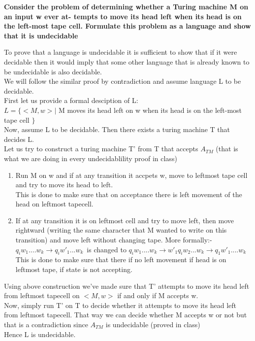 \documentclass{article}
\begin{document}
\textbf{Consider the problem of determining whether a Turing machine M on an input w ever at-
tempts to move its head left when its head is on the left-most tape cell. Formulate this
problem as a language and show that it is undecidable\\}

To prove that a language is undecidable it is sufficient to show that if it were decidable then it would imply
that some other language that is already known to be undecidable is also decidable.\\
We will follow the similar proof by contradiction and assume language L to be decidable.\\
First let us provide a formal desciption of L:\\
$L = \{ <M,w> | $ M moves its head left on w when its head is on the left-most tape cell $ \}$\\

Now, assume L to be decidable. Then there exists a turing machine T that decides L.\\
Let us try to construct a turing machine T' from T that accepts $A_{TM}$ (that is what we are doing in every undecidablility proof in class)
\begin{enumerate}
    \item Run M on w and if at any transition it accpets w, move to leftmost tape cell and try to move its head to left.\\
        This is done to make sure that on acceptance there is left movement of the head on leftmost tapecell.\\
    \item If at any transition it is on leftmost cell and try to move left, then move rightward (writing the same character that M wanted to write on this transition) and move 
            left without changing tape. More formally:- \\
            $q_iw_1....w_k \rightarrow q_iw'_1...w_k $\ is changed to $q_iw_1....w_k \rightarrow w'_1q_iw_2...w_k \rightarrow q_1w'_1....w_k$\\
            This is done to make sure that there if no left movement if head is on leftmost tape, if state is not accepting.
\end{enumerate} 

Using above construction we've made sure that T' attempts to move its head left from leftmost tapecell on $<M,w>$ if and only if M accepts w.\\
Now, simply run T' on T to decide whether it attempts to move its head left from leftmost tapecell. That way we can decide whether M accepts w or not but that is 
a contradiction since $A_{TM}$ is undecidable (proved in class)\\
Hence L is undecidable.
\end{document}
